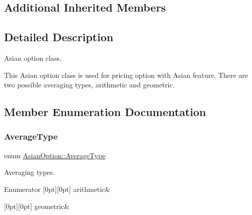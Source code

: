 \subsection*{Additional Inherited Members}


\subsection{Detailed Description}
Asian option class. 

This Asian option class is used for pricing option with Asian feature. There are two possible averaging types, arithmetic and geometric. 

\subsection{Member Enumeration Documentation}
\hypertarget{class_asian_option_add7292791bf85820ff9fdbfd4407f3b9}{}\label{class_asian_option_add7292791bf85820ff9fdbfd4407f3b9} 
\subsubsection{\texorpdfstring{Average\+Type}{AverageType}}
{\footnotesize\ttfamily enum \hyperlink{class_asian_option_add7292791bf85820ff9fdbfd4407f3b9}{Asian\+Option\+::\+Average\+Type}}



Averaging types. 

\begin{DoxyEnumFields}{Enumerator}
[0pt][0pt]{}\hypertarget{class_asian_option_add7292791bf85820ff9fdbfd4407f3b9aff8fffb81d05144807269caa96d3b145}{}\label{class_asian_option_add7292791bf85820ff9fdbfd4407f3b9aff8fffb81d05144807269caa96d3b145} 
arithmetic&\\
\hline

[0pt][0pt]{}\hypertarget{class_asian_option_add7292791bf85820ff9fdbfd4407f3b9a17b74dba78a6e25158da4eb685ecfa4e}{}\label{class_asian_option_add7292791bf85820ff9fdbfd4407f3b9a17b74dba78a6e25158da4eb685ecfa4e} 
geometric&\\
\hline

\end{DoxyEnumFields}


